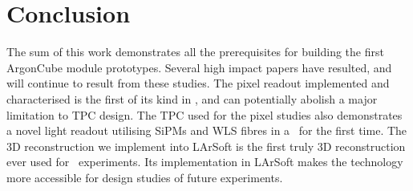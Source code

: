 \chapter{Conclusion\label{chap:conclusion}}
The sum of this work demonstrates all the prerequisites for building the first ArgonCube module prototypes.
Several high impact papers have resulted, and will continue to result from these studies.
The pixel readout implemented and characterised is the first of its kind in \lar, and can potentially abolish a major limitation to TPC design.
The TPC used for the pixel studies also demonstrates a novel light readout utilising SiPMs and WLS fibres in a \lartpc\ for the first time.
The 3D reconstruction we implement into LArSoft is the first truly 3D reconstruction ever used for \lar\ experiments.
Its implementation in LArSoft makes the technology more accessible for design studies of future experiments.